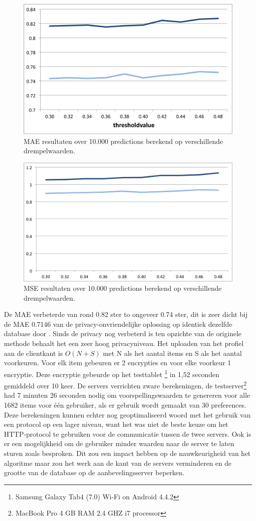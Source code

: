 \documentclass[twocolumn]{phdsymp} %
\begin{document}
\begin{figure}[ht]
\begin{center}
	\includegraphics[width=.40\textwidth]{mae}
	\caption{MAE resultaten over 10.000 predictions berekend op verschillende drempelwaarden.}
\end{center}
\end{figure}
\begin{figure}[ht]
\begin{center}
	\includegraphics[width=.40\textwidth]{mse}
	\caption{MSE resultaten over 10.000 predictions berekend op verschillende drempelwaarden.}
\end{center}
\end{figure}

De MAE verbeterde van rond 0.82 ster to ongeveer 0.74 ster, dit is zeer dicht bij de MAE 0.7146 van de privacy-onvriendelijke oplossing op identiek dezelfde database door \cite{rand}. Sinds de privacy nog verbeterd is ten opzichte van de originele methode behaalt het een zeer hoog privacyniveau. 
Het uploaden van het profiel aan de clientkant is $O(N+S)$ met N als het aantal items en S als het aantal voorkeuren. Voor elk item gebeuren er 2 encrypties en voor elke voorkeur 1 encryptie. Deze encryptie gebeurde op het testtablet \footnote{Samsung Galaxy Tab4 (7.0) Wi-Fi on Android 4.4.2} in 1,52 seconden gemiddeld over 10 keer. De servers verrichten zware berekeningen, de testserver\footnote{MacBook Pro 4 GB RAM 2.4 GHZ i7 processor} had 7 minuten 26 seconden nodig om voorspellingswaarden te genereren voor alle 1682 items voor één gebruiker, als er gebruik wordt gemaakt van 30 preferences. Deze berekeningen kunnen echter nog geoptimaliseerd woord met het gebruik van een protocol op een lager niveau, want het was niet de beste keuze om het HTTP-protocol te gebruiken voor de communicatie tussen de twee servers. Ook is er een mogelijkheid om de gebruiker minder waarden naar de server te laten sturen zoals besproken. Dit zou een impact hebben op de nauwkeurigheid van het algoritme maar zou het werk aan de kant van de servers verminderen en de grootte van de database op de aanbevelingsserver beperken.
 
\end{document}
